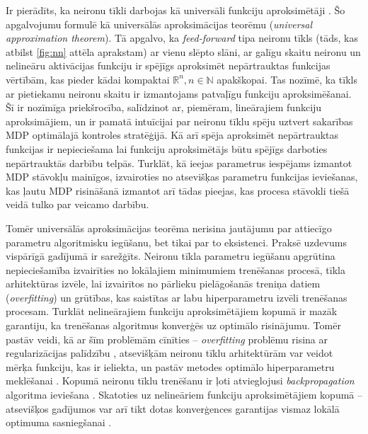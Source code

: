 \documentclass{ludis} %
\begin{document}
Ir pierādīts, ka neironu tīkli darbojas kā universāli funkciju aproksimētāji
\autocite{hornik1991approximation}. Šo apgalvojumu formulē kā universālās
aproksimācijas teorēmu (\textit{universal approximation theorem}). Tā apgalvo,
ka \textit{feed-forward} tipa neironu tīkls (tāds, kas atbilst \ref{fig:nn}
attēla aprakstam) ar vienu slēpto slāni, ar galīgu skaitu neironu un nelineāru
aktivācijas funkciju ir spējīgs aproksimēt nepārtrauktas funkcijas vērtībām, kas
pieder kādai kompaktai $\mathbb{R}^n, n \in \mathbb{N}$ apakškopai. Tas nozīmē,
ka tīkls ar pietiekamu neironu skaitu ir izmantojams patvaļīgu funkciju
aproksimēšanai. Šī ir nozīmīga priekšrocība, salīdzinot ar, piemēram,
lineārajiem funkciju aproksimājiem, un ir pamatā intuīcijai par neironu tīklu
spēju uztvert sakarības MDP optimālajā kontroles stratēģijā. Kā arī spēja
aproksimēt nepārtrauktas funkcijas ir nepieciešama lai funkciju aproksimētājs
būtu spējīgs darboties nepārtrauktās darbību telpās. Turklāt, kā ieejas
parametrus iespējams izmantot MDP stāvokļu mainīgos, izvairoties no atsevišķas
parametru funkcijas ieviešanas, kas ļautu MDP risināšanā izmantot arī tādas
pieejas, kas procesa stāvokli tiešā veidā tulko par veicamo darbību.

Tomēr universālās aproksimācijas teorēma nerisina jautājumu par attiecīgo
parametru algoritmisku iegūšanu, bet tikai par to eksistenci. Praksē uzdevums
vispārīgā gadījumā ir sarežģīts. Neironu tīkla parametru iegūšanu apgrūtina
nepieciešamība izvairīties no lokālajiem minimumiem trenēšanas procesā, tīkla
arhitektūras izvēle, lai izvairītos no pārlieku pielāgošanās treniņa datiem
(\textit{overfitting}) un grūtības, kas saistītas ar labu hiperparametru izvēli
trenēšanas procesam. Turklāt nelineārajiem funkciju aproksimētājiem kopumā ir
mazāk garantiju, ka trenēšanas algoritmus konverģēs uz optimālo risinājumu.
Tomēr pastāv veidi, kā ar šīm problēmām cīnīties -- \textit{overfitting}
problēmu risina ar regularizācijas palīdzību \autocite{sarle1995stopped}
\autocite{srivastava2014dropout}, atsevišķām neironu tīklu arhitektūrām var
veidot mērķa funkciju, kas ir ieliekta, un pastāv metodes optimālo
hiperparametru meklēšanai \autocite{bergstra2011algorithms}. Kopumā neironu
tīklu trenēšanu ir ļoti atvieglojusi \textit{backpropagation} algoritma
ieviešana \autocite{Werbos74} \autocite{Rumelhart1988}. Skatoties uz nelineāriem
funkciju aproksimētājiem kopumā -- atsevišķos gadījumos var arī tikt dotas
konverģences garantijas vismaz lokālā optimuma sasniegšanai
\autocite{bhatnagar2009convergent}.
\end{document}
